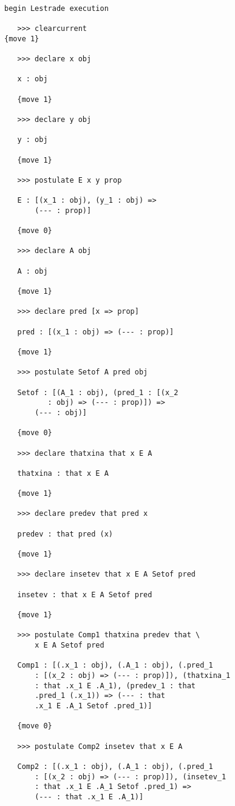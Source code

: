 \documentclass[12pt]{article}
\begin{document}
\begin{verbatim}

begin Lestrade execution

   >>> clearcurrent
{move 1}

   >>> declare x obj

   x : obj

   {move 1}

   >>> declare y obj

   y : obj

   {move 1}

   >>> postulate E x y prop

   E : [(x_1 : obj), (y_1 : obj) => 
       (--- : prop)]

   {move 0}

   >>> declare A obj

   A : obj

   {move 1}

   >>> declare pred [x => prop]

   pred : [(x_1 : obj) => (--- : prop)]

   {move 1}

   >>> postulate Setof A pred obj

   Setof : [(A_1 : obj), (pred_1 : [(x_2 
          : obj) => (--- : prop)]) => 
       (--- : obj)]

   {move 0}

   >>> declare thatxina that x E A

   thatxina : that x E A

   {move 1}

   >>> declare predev that pred x

   predev : that pred (x)

   {move 1}

   >>> declare insetev that x E A Setof pred

   insetev : that x E A Setof pred

   {move 1}

   >>> postulate Comp1 thatxina predev that \
       x E A Setof pred

   Comp1 : [(.x_1 : obj), (.A_1 : obj), (.pred_1 
       : [(x_2 : obj) => (--- : prop)]), (thatxina_1 
       : that .x_1 E .A_1), (predev_1 : that 
       .pred_1 (.x_1)) => (--- : that 
       .x_1 E .A_1 Setof .pred_1)]

   {move 0}

   >>> postulate Comp2 insetev that x E A

   Comp2 : [(.x_1 : obj), (.A_1 : obj), (.pred_1 
       : [(x_2 : obj) => (--- : prop)]), (insetev_1 
       : that .x_1 E .A_1 Setof .pred_1) => 
       (--- : that .x_1 E .A_1)]


\end{verbatim}
\end{document}
